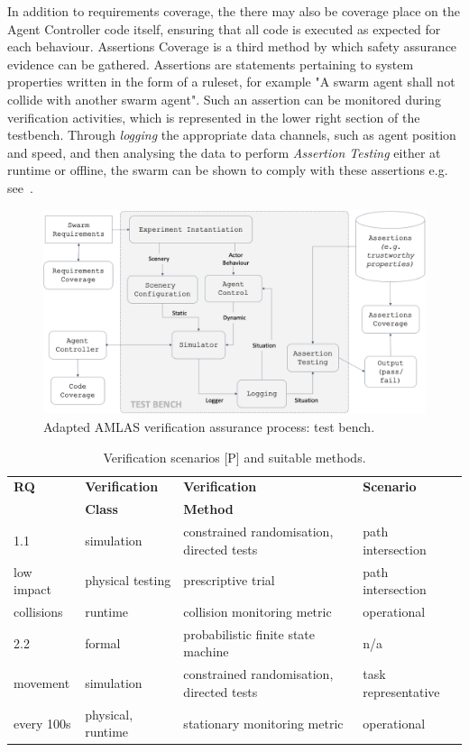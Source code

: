 \documentclass[lettersize,journal]{IEEEtran}
\begin{document}
In addition to requirements coverage, the there may also be coverage place on the Agent Controller code itself, ensuring that all code is executed as expected for each behaviour. Assertions Coverage is a third method by which safety assurance evidence can be gathered. Assertions are statements pertaining to system properties written in the form of a ruleset, for example "A swarm agent shall not collide with another swarm agent". Such an assertion can be monitored during verification activities, which is represented in the lower right section of the testbench. Through \emph{logging} the appropriate data channels, such as agent position and speed, and then analysing the data to perform \emph{Assertion Testing} either at runtime or offline, the swarm can be shown to comply with these assertions e.g. see~\cite{harper2021safety}. 

\begin{figure}
	\centering
	\includegraphics[width=1.0\textwidth]{figures/verification-testbench.png}
	\caption{Adapted AMLAS verification assurance process: test bench.}
	\label{amlas-a-testbench}
\end{figure}


\begin{table}[t]
\caption{Verification scenarios [P] and suitable methods.}\label{tab:testgen}
\centering
\begin{tabular}{llll}
\textbf{RQ}   & \textbf{Verification}  & \textbf{Verification} & \textbf{Scenario} \\ 
              & \textbf{Class}         & \textbf{Method}		  & 		          \\ 
\hline
1.1 	      & simulation 	   & constrained randomisation, directed tests & path intersection     \\
low impact    & physical testing   & prescriptive trial 				       & path intersection	 \\
collisions    & runtime		   & collision monitoring metric 		       & operational		 \\
\hline
2.2 	      & formal 	 	   & probabilistic finite state machine 	   & n/a      \\
movement      & simulation 	   & constrained randomisation, directed tests & task representative     \\
every 100s    & physical, runtime  & stationary monitoring metric 			   & operational		 \\
\hline
\end{tabular}
\end{table}
\end{document}
